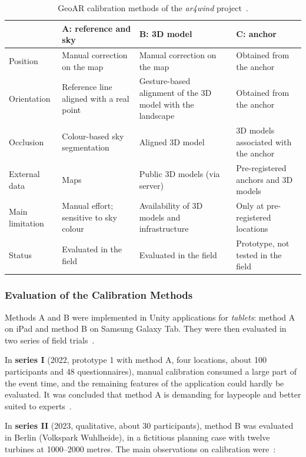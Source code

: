\begin{table}[htbp]
\centering
\caption{GeoAR calibration methods of the \textit{ar4wind} project~\cite{ar4wind2023}.}
\label{tab:ar4wind_metodos}
\small
\begin{tabular}{p{2.5cm}p{3.5cm}p{3.5cm}p{3.5cm}}
\hline
 & \textbf{A: reference and sky} & \textbf{B: 3D model} & \textbf{C: anchor} \\
\hline
Position & Manual correction on the map & Manual correction on the map & Obtained from the anchor \\
Orientation & Reference line aligned with a real point & Gesture-based alignment of the 3D model with the landscape & Obtained from the anchor \\
Occlusion & Colour-based sky segmentation & Aligned 3D model & 3D models associated with the anchor \\
External data & Maps & Public 3D models (via server) & Pre-registered anchors and 3D models \\
Main limitation & Manual effort; sensitive to sky colour & Availability of 3D models and infrastructure & Only at pre-registered locations \\
Status & Evaluated in the field & Evaluated in the field & Prototype, not tested in the field \\
\hline
\end{tabular}
\end{table}

\subsubsection{Evaluation of the Calibration Methods}

Methods A and B were implemented in Unity applications for \textit{tablets}: method A on iPad and method B on Samsung Galaxy Tab. They were then evaluated in two series of field trials~\cite[Sec.~2.2.3 and 2.2.4]{ar4wind2023}.

In \textbf{series I} (2022, prototype 1 with method A, four locations, about 100 participants and 48 questionnaires), manual calibration consumed a large part of the event time, and the remaining features of the application could hardly be evaluated. It was concluded that method A is demanding for laypeople and better suited to experts~\cite[Sec.~2.2.4.1]{ar4wind2023}.

In \textbf{series II} (2023, qualitative, about 30 participants), method B was evaluated in Berlin (Volkspark Wuhlheide), in a fictitious planning case with twelve turbines at 1000--2000 metres. The main observations on calibration were~\cite[Sec.~2.2.4.2]{ar4wind2023}:

